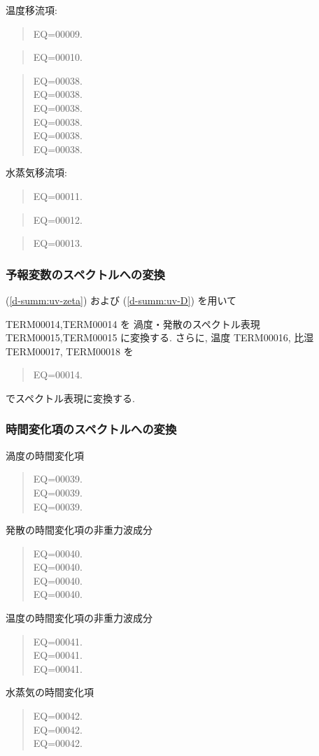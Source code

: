 温度移流項:
\begin{quote}
EQ=00009.
\end{quote}
\begin{quote}
EQ=00010.
\end{quote}
%
\begin{quote}
\nonumber
EQ=00038.\\
\nonumber
EQ=00038.\\
\nonumber
EQ=00038.\\
\nonumber
EQ=00038.\\
\nonumber
EQ=00038.\\
EQ=00038.
\end{quote}

水蒸気移流項:
\begin{quote}
EQ=00011.
\end{quote}
\begin{quote}
EQ=00012.
\end{quote}
%
\begin{quote}
EQ=00013.
\end{quote}

\subsubsection{予報変数のスペクトルへの変換}

(\ref{d-summ:uv-zeta}) および
(\ref{d-summ:uv-D}) を用いて

TERM00014,TERM00014 を
渦度・発散のスペクトル表現
TERM00015,TERM00015 に変換する.
さらに,
温度 TERM00016, 比湿 TERM00017, 
TERM00018 を
\begin{quote}
EQ=00014.
\end{quote}
でスペクトル表現に変換する.

\subsubsection{時間変化項のスペクトルへの変換}

渦度の時間変化項
\begin{quote}
\nonumber
EQ=00039.\\
\nonumber
EQ=00039.\\
EQ=00039.
\end{quote}
%
発散の時間変化項の非重力波成分
\begin{quote}
\nonumber
EQ=00040.\\
\nonumber
EQ=00040.\\
\nonumber
EQ=00040.\\
EQ=00040.
\end{quote}
%
温度の時間変化項の非重力波成分
\begin{quote}
\nonumber
EQ=00041.\\
\nonumber
EQ=00041.\\
EQ=00041.
\end{quote}
%
水蒸気の時間変化項
\begin{quote}
\nonumber
EQ=00042.\\
\nonumber
EQ=00042.\\
EQ=00042.
\end{quote}

